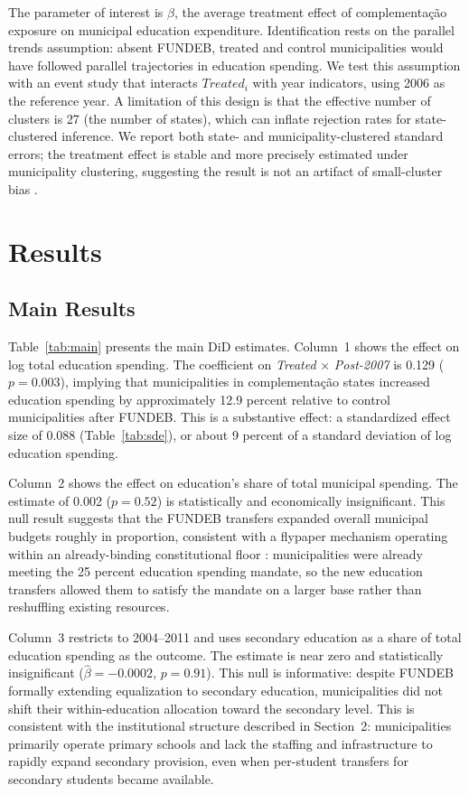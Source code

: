 \documentclass[12pt]{article}
\begin{document}
The parameter of interest is $\beta$, the average treatment effect of complementa\c{c}\~ao
exposure on municipal education expenditure. Identification rests on the parallel trends
assumption: absent FUNDEB, treated and control municipalities would have followed
parallel trajectories in education spending. We test this assumption with an event
study that interacts $\textit{Treated}_i$ with year indicators, using 2006 as the
reference year. A limitation of this design is that the effective number of clusters is
27 (the number of states), which can inflate rejection rates for state-clustered
inference. We report both state- and municipality-clustered standard errors;
the treatment effect is stable and more precisely estimated under municipality clustering,
suggesting the result is not an artifact of small-cluster bias \citep{cameron2008}.

\section{Results}

\subsection{Main Results}

Table~\ref{tab:main} presents the main DiD estimates. Column~1 shows the effect on
log total education spending. The coefficient on \textit{Treated} $\times$ \textit{Post-2007}
is 0.129 ($p = 0.003$), implying that municipalities in complementa\c{c}\~ao states
increased education spending by approximately 12.9 percent relative to control
municipalities after FUNDEB. This is a substantive effect: a standardized effect size
of 0.088 (Table~\ref{tab:sde}), or about 9 percent of a standard deviation of log
education spending.

Column~2 shows the effect on education's share of total municipal spending. The estimate
of 0.002 ($p = 0.52$) is statistically and economically insignificant. This null result
suggests that the FUNDEB transfers expanded overall municipal budgets roughly in
proportion, consistent with a flypaper mechanism operating within an already-binding
constitutional floor \citep{hines1995}: municipalities were already meeting the 25
percent education spending mandate, so the new education transfers allowed them to
satisfy the mandate on a larger base rather than reshuffling existing resources.

Column~3 restricts to 2004--2011 and uses secondary education as a share of total
education spending as the outcome. The estimate is near zero and statistically
insignificant ($\hat{\beta} = -0.0002$, $p = 0.91$). This null is informative: despite
FUNDEB formally extending equalization to secondary education, municipalities did not
shift their within-education allocation toward the secondary level. This is consistent
with the institutional structure described in Section~2: municipalities primarily
operate primary schools and lack the staffing and infrastructure to rapidly expand
secondary provision, even when per-student transfers for secondary students became
available.
\end{document}
